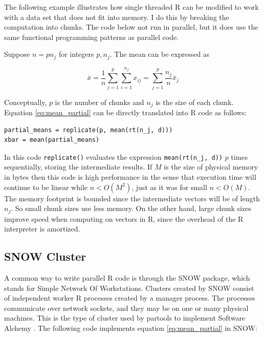 \documentclass[12pt]{article}
\begin{document}
The following example illustrates how single threaded R can be modified to
work with a data set that does not fit into memory. I do this 
by breaking the computation into chunks. The code below not run in parallel,
but it does use the same functional programming patterns as parallel code. 

Suppose $n = p n_j$ for integers $p, n_j$.  The mean can be
expressed as 

\begin{equation}
    \bar{x} = \frac{1}{n} \sum_{j = 1}^p \sum_{i = 1}^{n_j} x_{ij}
    = \sum_{j = 1}^p \frac{n_j}{n} \bar{x}_j
\label{eq:mean_partial}
\end{equation}

Conceptually, $p$ is the number of chunks and $n_j$ is the size of each
chunk. Equation \ref{eq:mean_partial} can be directly translated into R
code as follows:

\begin{verbatim}
partial_means = replicate(p, mean(rt(n_j, d)))
xbar = mean(partial_means)
\end{verbatim}

In this code \texttt{replicate()} evaluates the expression
\texttt{mean(rt(n\_j, d))} $p$ times sequentially, storing the intermediate
results.  If $M$ is the size of physical memory in bytes then this code is
high performance in the sense that execution time will continue to be
linear while $n < O(M^2)$, just as it was for small $n < O(M)$. The memory
footprint is bounded since the intermediate vectors will be of length
$n_j$. So small chunk sizes use less memory. On the other hand, large chunk
sizes improve speed when computing on vectors in R, since the overhead of
the R interpreter is amortized. 



\subsection{SNOW Cluster}

A common way to write parallel R code is through the SNOW package, which
stands for Simple Network Of Workstations.  Clusters created by SNOW
consist of independent worker R processes created by a manager process. The
processes communicate over network sockets, and they may be on one or many
physical machines.  This is the type of cluster used by partools to
implement Software Alchemy \cite{R-partools} \cite{matloff2014software}.
The following code implements equation \ref{eq:mean_partial} in SNOW:
\end{document}
